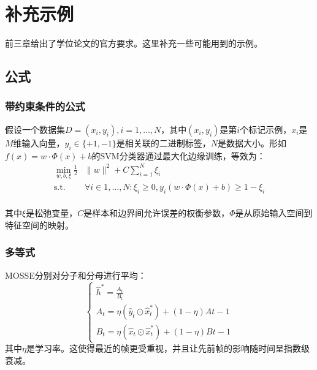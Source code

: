 \chapter{补充示例}

前三章给出了学位论文的官方要求。这里补充一些可能用到的示例。

\section{公式}

\subsection{带约束条件的公式}

假设一个数据集$D = {(x_i,y_i),i = 1,\dots,N}$，其中$(x_i,y_i)$是第$i$个标记示例，$x_i$是$M$维输入向量，$y_i\in\{+1,-1\}$是相关联的二进制标签，$N$是数据大小。形如$f(x)= w\cdot\Phi(x)+ b$的SVM分类器通过最大化边缘训练，等效为：
~\\
\begin{subequations}
\begin{align}
    \min_{w,b,\xi} \frac{1}{2}&\|w\|^2 + C\sum_{i=1}^N\xi_i\\
    \mathrm{s.t.}\quad &\forall i\in1,\dots,N:\xi_i\ge 0,y_i(w\cdot\Phi(x)+b)\ge 1-\xi_i
\end{align}
\label{eq:RT_SVMoptimizationFunction}
\end{subequations}
~\\
其中$\xi$是松弛变量，$C$是样本和边界间允许误差的权衡参数，$\Phi$是从原始输入空间到特征空间的映射。

\subsection{多等式}

MOSSE分别对分子和分母进行平均：
\begin{equation}
    \left\{\begin{array}{l}
    \hat{h}^{*}=\frac{A_{t}}{B_{t}} \\
    A_{t}=\eta\left(\hat{y}_{t} \odot \hat{x}_{t}^{*}\right)+(1-\eta) A t-1 \\
    B_{t}=\eta\left(\hat{x}_{t} \odot \hat{x}_{t}^{*}\right)+(1-\eta) B t-1
    \end{array}\right.
    \label{eq:RT_MOSSEruningAverage}
\end{equation}
其中$\eta$是学习率。这使得最近的帧更受重视，并且让先前帧的影响随时间呈指数级衰减。


